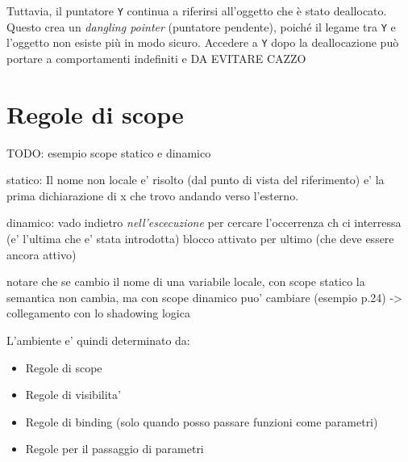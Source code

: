 \begin{itemize}
  Tuttavia, il puntatore \texttt{Y} continua a riferirsi all'oggetto  
  che è stato deallocato. Questo crea un \textit{dangling pointer} (puntatore pendente),  
  poiché il legame tra \texttt{Y} e l'oggetto non esiste più in modo sicuro.  
  Accedere a \texttt{Y} dopo la deallocazione può portare a comportamenti indefiniti e DA EVITARE CAZZO 


\end{itemize}




\section{Regole di scope}

TODO: esempio scope statico e dinamico

statico:
Il nome non locale e' risolto (dal punto di vista del riferimento) e' la prima dichiarazione di x che trovo andando verso l'esterno.

dinamico: 
vado indietro \textit{nell'escecuzione} per cercare l'occerrenza ch ci interressa (e' l'ultima che e' stata introdotta) blocco attivato per ultimo (che deve essere ancora attivo)

notare che se cambio il nome di una variabile locale, con scope statico la semantica non cambia, ma con scope dinamico puo' cambiare (esempio p.24) -> collegamento con lo shadowing logica

L'ambiente e' quindi determinato da:
\begin{itemize}
\item Regole di scope
\item Regole di visibilita'
\item Regole di binding (solo quando posso passare funzioni come parametri)
\item Regole per il passaggio di parametri
\end{itemize}

% 
